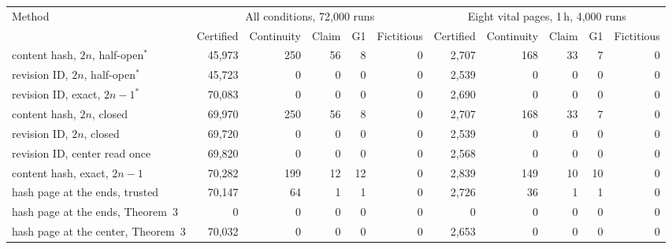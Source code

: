\begin{tabular}{@{}lrrrrrrrrrr@{}}
\toprule
Method & \multicolumn{5}{c}{All conditions, 72{,}000 runs} & \multicolumn{5}{c}{Eight vital pages, 1\,h, 4{,}000 runs} \\ \cmidrule(lr){2-6}\cmidrule(l){7-11}
 & Certified & Continuity & Claim & G1 & Fictitious & Certified & Continuity & Claim & G1 & Fictitious \\
\midrule
content hash, $2n$, half-open$^{\ast}$ & 45,973 & 250 & 56 & 8 & 0 & 2,707 & 168 & 33 & 7 & 0 \\
revision ID, $2n$, half-open$^{\ast}$ & 45,723 & 0 & 0 & 0 & 0 & 2,539 & 0 & 0 & 0 & 0 \\
revision ID, exact, $2n{-}1^{\ast}$ & 70,083 & 0 & 0 & 0 & 0 & 2,690 & 0 & 0 & 0 & 0 \\
content hash, $2n$, closed & 69,970 & 250 & 56 & 8 & 0 & 2,707 & 168 & 33 & 7 & 0 \\
revision ID, $2n$, closed & 69,720 & 0 & 0 & 0 & 0 & 2,539 & 0 & 0 & 0 & 0 \\
revision ID, center read once & 69,820 & 0 & 0 & 0 & 0 & 2,568 & 0 & 0 & 0 & 0 \\
content hash, exact, $2n{-}1$ & 70,282 & 199 & 12 & 12 & 0 & 2,839 & 149 & 10 & 10 & 0 \\
hash page at the ends, trusted & 70,147 & 64 & 1 & 1 & 0 & 2,726 & 36 & 1 & 1 & 0 \\
hash page at the ends, Theorem~3 & 0 & 0 & 0 & 0 & 0 & 0 & 0 & 0 & 0 & 0 \\
hash page at the center, Theorem~3 & 70,032 & 0 & 0 & 0 & 0 & 2,653 & 0 & 0 & 0 & 0 \\
\bottomrule
\end{tabular}
